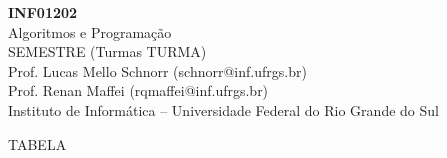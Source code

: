 \documentclass[11pt,portuguese,]{article}
\begin{document}
\clearpage\thispagestyle{empty}

\begin{center}
  {\LARGE     {\bf INF01202} \\
    Algoritmos e Programação \\
    SEMESTRE (Turmas TURMA)} \\
  Prof. Lucas Mello Schnorr (schnorr@inf.ufrgs.br) \\
  Prof. Renan Maffei (rqmaffei@inf.ufrgs.br) \\
  Instituto de Informática -- Universidade Federal do Rio Grande do Sul
\end{center}

TABELA
\end{document}
